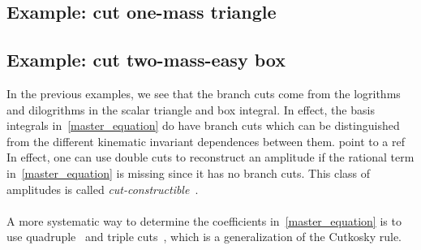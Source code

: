 \subsection{Example: cut one-mass triangle}

\subsection{Example: cut two-mass-easy box}
%
In the previous examples, we see that the branch cuts come from the logrithms and dilogrithms in the scalar triangle and box integral. 
In effect, the basis integrals in~\cref{master_equation} do have branch cuts which can be distinguished from the different kinematic invariant dependences between them.
\color{red}point to a ref\color{black}
In effect, one can use double cuts to reconstruct an amplitude if the rational term in~\cref{master_equation} is missing since it has no branch cuts.
This class of amplitudes is called \textit{cut-constructible}~\cite{Bern:1994cg}. 
\\\\
A more systematic way to determine the coefficients in~\cref{master_equation} is to use quadruple~\cite{BRITTO2005499} and triple cuts~\cite{Forde:2007mi}, which is a generalization of the Cutkosky rule.